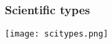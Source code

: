 \documentclass[t]{beamer}
\newcommand\df{\bf\color{Maroon}}
\begin{document}

\begin{frame}
  \frametitle{Scientific types}
  \vspace{-0.5\baselineskip}
  \begin{center}
    \texttt{[image: scitypes.png]}
  \end{center}%
\end{frame}

\end{document}
